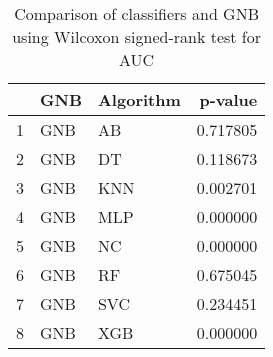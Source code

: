 \begin{table}
\footnotesize
\caption{Comparison of classifiers and GNB using Wilcoxon signed-rank test for AUC}
\label{tab:GNB wilcoxon AUC comparison}
\begin{tabular}{lllr}
\hline
 & GNB & Algorithm & p-value \\
\hline
1 & GNB & AB & 0.717805 \\
2 & GNB & DT & 0.118673 \\
3 & GNB & KNN & 0.002701 \\
4 & GNB & MLP & 0.000000 \\
5 & GNB & NC & 0.000000 \\
6 & GNB & RF & 0.675045 \\
7 & GNB & SVC & 0.234451 \\
8 & GNB & XGB & 0.000000 \\
\hline
\end{tabular}
\end{table}
